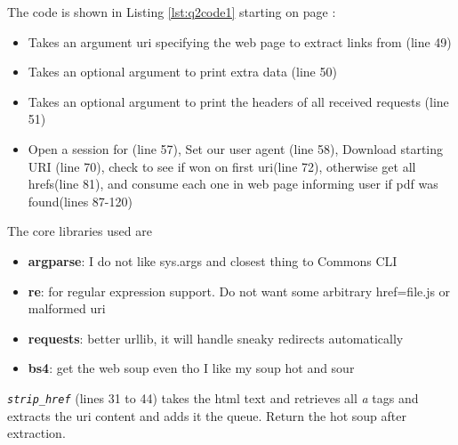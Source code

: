 \documentclass[letterpaper,10pt]{article}
\begin{document}
The code is shown in Listing \ref{lst:q2code1} starting on page \pageref{lst:q2code1}:
\begin{itemize}
\item Takes an argument uri specifying the web page to extract links from (line 49)
\item Takes an optional argument to print extra data (line 50)
\item Takes an optional argument to print the headers of all received requests (line 51)
\item Open a session for (line 57), Set our user agent (line 58), Download starting URI (line 70), check to see if won on first uri(line 72), otherwise get all hrefs(line 81), and consume each one in web page informing user if pdf was found(lines 87-120)
\end{itemize}
\noindent
The core libraries used are
\begin{itemize}
\item \textbf{argparse}: I do not like sys.args and closest thing to Commons CLI
\item \textbf{re}: for regular expression support. Do not want some arbitrary href=file.js or malformed uri
\item \textbf{requests}: better urllib, it will handle sneaky redirects automatically   
\item \textbf{bs4}: get the web soup even tho I like my soup hot and sour 
\end{itemize}  
\noindent
\emph{\texttt{strip\_href}} (lines 31 to 44) takes the html text and retrieves all \emph{a} tags and extracts the uri content and adds it the queue. Return the hot soup after extraction.
\newline 
\end{document}
